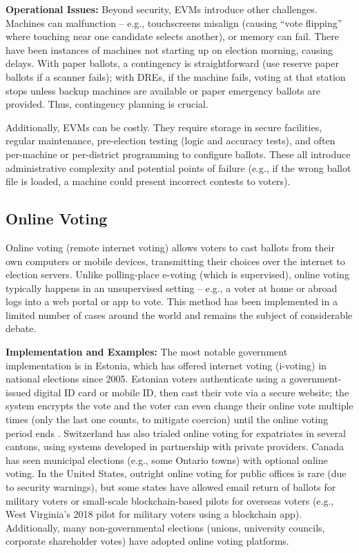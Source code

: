 \documentclass[a4paper,10pt]{report}
\begin{document}
\textbf {Operational Issues:} Beyond security, EVMs introduce other challenges. Machines can malfunction – e.g., touchscreens misalign (causing “vote flipping” where touching near one candidate selects another), or memory can fail. There have been instances of machines not starting up on election morning, causing delays. With paper ballots, a contingency is straightforward (use reserve paper ballots if a scanner fails); with DREs, if the machine fails, voting at that station stops unless backup machines are available or paper emergency ballots are provided. Thus, contingency planning is crucial.

Additionally, EVMs can be costly. They require storage in secure facilities, regular maintenance, pre-election testing (logic and accuracy tests), and often per-machine or per-district programming to configure ballots. These all introduce administrative complexity and potential points of failure (e.g., if the wrong ballot file is loaded, a machine could present incorrect contests to voters).

\subsection{Online Voting}

Online voting (remote internet voting) allows voters to cast ballots from their own computers or mobile devices, transmitting their choices over the internet to election servers. Unlike polling-place e-voting (which is supervised), online voting typically happens in an unsupervised setting – e.g., a voter at home or abroad logs into a web portal or app to vote. This method has been implemented in a limited number of cases around the world and remains the subject of considerable debate.

\textbf {Implementation and Examples:} The most notable government implementation is in Estonia, which has offered internet voting (i-voting) in national elections since 2005. Estonian voters authenticate using a government-issued digital ID card or mobile ID, then cast their vote via a secure website; the system encrypts the vote and the voter can even change their online vote multiple times (only the last one counts, to mitigate coercion) until the online voting period ends \cite{jhalderm}. Switzerland has also trialed online voting for expatriates in several cantons, using systems developed in partnership with private providers. Canada has seen municipal elections (e.g., some Ontario towns) with optional online voting. In the United States, outright online voting for public offices is rare (due to security warnings), but some states have allowed email return of ballots for military voters or small-scale blockchain-based pilots for overseas voters (e.g., West Virginia’s 2018 pilot for military voters using a blockchain app). Additionally, many non-governmental elections (unions, university councils, corporate shareholder votes) have adopted online voting platforms.
\end{document}
